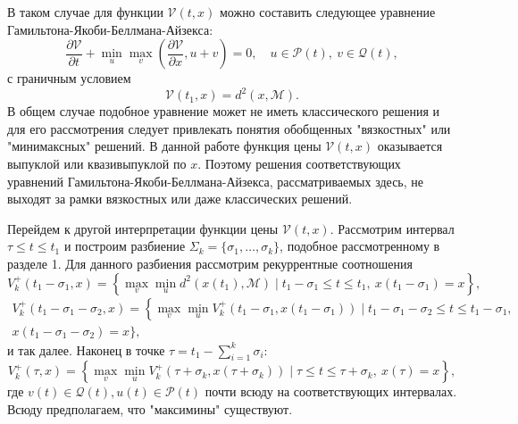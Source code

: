 В таком случае для функции \( \mathcal{V}(t,x) \) можно составить следующее уравнение 
 Гамильтона-Якоби-Беллмана-Айзекса:
\begin{equation}\label{HJBI}
    \frac{\partial \mathcal{V}}{\partial t} + \min_u \max_v \left( \frac{\partial \mathcal{V}}
     {\partial x}, u + v \right) = 0, \quad u \in \mathcal{P}(t), \ v \in \mathcal{Q}(t),
\end{equation}
с граничным условием
\begin{equation}\label{HJBI_boundary}
    \mathcal{V}(t_1, x) = d^2(x, \mathcal{M}).
\end{equation}
В общем случае подобное уравнение может не иметь классического решения и для его рассмотрения
 следует привлекать понятия обобщенных "вязкостных" или "минимаксных" решений. В данной работе
 функция цены \( \mathcal{V}(t,x) \) оказывается выпуклой или квазивыпуклой по \( x \). Поэтому
 решения соответствующих уравнений Гамильтона-Якоби-Беллмана-Айзекса, рассматриваемых здесь, не
 выходят за рамки вязкостных или даже классических решений.

Перейдем к другой интерпретации функции цены \( \mathcal{V}(t,x) \). Рассмотрим интервал 
 \( \tau \le t \le t_1 \) и построим разбиение \( \Sigma_k = \{ \sigma_1, \dots, \sigma_k \} \),
 подобное рассмотренному в разделе 1. Для данного разбиения рассмотрим рекуррентные соотношения
\begin{equation*}
    V_k^+(t_1 - \sigma_1, x) = \left\{ \max_v \min_u d^2(x(t_1), \mathcal{M}) \mid t_1 -
     \sigma_1 \le t \le t_1, \ x(t_1 - \sigma_1) = x \right\},
\end{equation*}
\begin{multline*} 
    V_k^+(t_1 - \sigma_1 - \sigma_2, x) = \left\{ \max_v \min_u V_k^+(t_1 - \sigma_1, x(t_1 -
     \sigma_1)) \mid t_1 - \sigma_1 - \sigma_2 \le t \le t_1 - \sigma_1, \right. \\ 
    x(t_1 - \sigma_1 - \sigma_2) = x \Big\},
\end{multline*}
и так далее. Наконец в точке \( \tau = t_1 - \sum\limits_{i = 1}^k \sigma_i \):
\begin{equation*}
    V_k^+(\tau, x) = \left\{ \max_v \min_u V_k^+ (\tau + \sigma_k, x(\tau + \sigma_k)) \mid
     \tau \le t \le \tau + \sigma_k, \ x(\tau) = x \right\},
\end{equation*}
где \( v(t) \in \mathcal{Q}(t), u(t) \in  \mathcal{P}(t) \) почти всюду на соответствующих
 интервалах. Всюду предполагаем, что "максимины" существуют.

